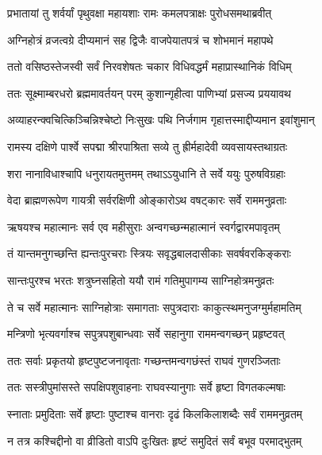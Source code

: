 
\twolineshloka
{प्रभातायां तु शर्वर्यां पृथुवक्षा महायशाः}
{रामः कमलपत्राक्षः पुरोधसमथाब्रवीत्} %

\twolineshloka
{अग्निहोत्रं व्रजत्वग्रे दीप्यमानं सह द्विजैः}
{वाजपेयातपत्रं च शोभमानं महापथे} %

\twolineshloka
{ततो वसिष्ठस्तेजस्वी सर्वं निरवशेषतः}
{चकार विधिवद्धर्मं महाप्रास्थानिकं विधिम्} %

\twolineshloka
{ततः सूक्ष्माम्बरधरो ब्रह्ममावर्तयन् परम्}
{कुशान्गृहीत्वा पाणिभ्यां प्रसज्य प्रययावथ} %

\twolineshloka
{अव्याहरन्क्वचित्किञ्चिन्निश्चेष्टो निःसुखः पथि}
{निर्जगाम गृहात्तस्माद्दीप्यमान इवांशुमान्} %

\twolineshloka
{रामस्य दक्षिणे पार्श्वे सपद्मा श्रीरपाश्रिता}
{सव्ये तु ह्रीर्महादेवी व्यवसायस्तथाग्रतः} %

\twolineshloka
{शरा नानाविधाश्चापि धनुरायतमुत्तमम्}
{तथाऽऽयुधानि ते सर्वे ययुः पुरुषविग्रहाः} %

\twolineshloka
{वेदा ब्राह्मणरूपेण गायत्री सर्वरक्षिणी}
{ओङ्कारोऽथ वषट्कारः सर्वे राममनुव्रताः} %

\twolineshloka
{ऋषयश्च महात्मानः सर्व एव महीसुराः}
{अन्वगच्छन्महात्मानं स्वर्गद्वारमपावृतम्} %

\twolineshloka
{तं यान्तमनुगच्छन्ति ह्यन्तःपुरचराः स्त्रियः}
{सवृद्धबालदासीकाः सवर्षवरकिङ्कराः} %

\twolineshloka
{सान्तःपुरश्च भरतः शत्रुघ्नसहितो ययौ}
{रामं गतिमुपागम्य साग्निहोत्रमनुव्रतः} %

\twolineshloka
{ते च सर्वे महात्मानः साग्निहोत्राः समागताः}
{सपुत्रदाराः काकुत्स्थमनुजग्मुर्महामतिम्} %

\twolineshloka
{मन्त्रिणो भृत्यवर्गाश्च सपुत्रपशुबान्धवाः}
{सर्वे सहानुगा राममन्वगच्छन् प्रहृष्टवत्} %

\twolineshloka
{ततः सर्वाः प्रकृतयो हृष्टपुष्टजनावृताः}
{गच्छन्तमन्वगछंस्तं राघवं गुणरञ्जिताः} %

\twolineshloka
{ततः सस्त्रीपुमांसस्ते सपक्षिपशुवाहनाः}
{राघवस्यानुगाः सर्वे हृष्टा विगतकल्मषाः} %

\twolineshloka
{स्नाताः प्रमुदिताः सर्वे हृष्टाः पुष्टाश्च वानराः}
{दृढं किलकिलाशब्दैः सर्वं राममनुव्रतम्} %

\twolineshloka
{न तत्र कश्चिद्दीनो वा व्रीडितो वाऽपि दुःखितः}
{हृष्टं समुदितं सर्वं बभूव परमाद्भुतम्} %

